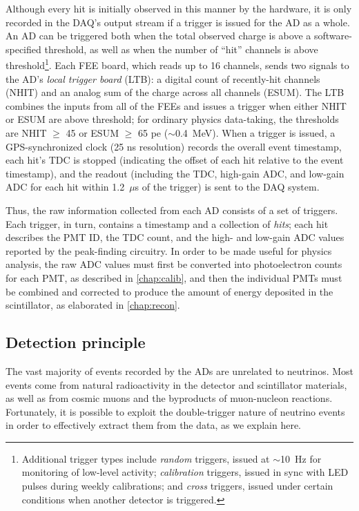 \documentclass[../thesis.tex]{subfiles}
\begin{document}
Although every hit is initially observed in this manner by the hardware, it is
only recorded in the DAQ's output stream if a trigger is issued for the AD as a
whole. An AD can be triggered both when the total observed charge is above a
software-specified threshold, as well as when the number of ``hit'' channels is
above threshold\footnote{Additional trigger types include \emph{random}
  triggers, issued at $\sim$10~Hz for monitoring of low-level activity;
  \emph{calibration} triggers, issued in sync with LED pulses during weekly
  calibrations; and \emph{cross} triggers, issued under certain conditions when
  another detector is triggered.}. Each FEE board, which reads up to 16
channels, sends two signals to the AD's \emph{local trigger board} (LTB): a
digital count of recently-hit channels (NHIT) and an analog sum of the charge
across all channels (ESUM). The LTB combines the inputs from all of the FEEs and
issues a trigger when either NHIT or ESUM are above threshold; for ordinary
physics data-taking, the thresholds are NHIT $\geq$ 45 or ESUM $\geq$ 65 pe
($\sim$0.4~MeV). When a trigger is issued, a GPS-synchronized clock (25 ns
resolution) records the overall event timestamp, each hit's TDC is stopped
(indicating the offset of each hit relative to the event timestamp), and the
readout (including the TDC, high-gain ADC, and low-gain ADC for each hit within
1.2~$\mu$s of the trigger) is sent to the DAQ system.

Thus, the raw information collected from each AD consists of a set of
triggers. Each trigger, in turn, contains a timestamp and a collection of
\emph{hits}; each hit describes the PMT ID, the TDC count, and the high- and
low-gain ADC values reported by the peak-finding circuitry. In order to be made
useful for physics analysis, the raw ADC values must first be converted into
photoelectron counts for each PMT, as described in \autoref{chap:calib}, and
then the individual PMTs must be combined and corrected to produce the amount of
energy deposited in the scintillator, as elaborated in \autoref{chap:recon}.

\subsection{Detection principle}
\label{sec:expDetPrinc}

The vast majority of events recorded by the ADs are unrelated to neutrinos. Most
events come from natural radioactivity in the detector and scintillator
materials, as well as from cosmic muons and the byproducts of muon-nucleon
reactions. Fortunately, it is possible to exploit the double-trigger nature of
neutrino events in order to effectively extract them from the data, as we
explain here.
\end{document}
